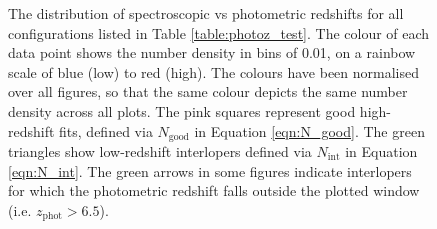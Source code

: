 \begin{figure}
\centering
{}
\caption[\texorpdfstring{$z_{\mathrm{spec}}$}{} vs \texorpdfstring{$z_{\mathrm{phot}}$}{} distributions of the test configurations]{The distribution of spectroscopic vs photometric redshifts for all configurations listed in Table \ref{table:photoz_test}. The colour of each data point shows the number density in bins of 0.01, on a rainbow scale of blue (low) to red (high). The colours have been normalised over all figures, so that the same colour depicts the same number density across all plots. The pink squares represent good high-redshift fits, defined via $N_{\mathrm{good}}$ in Equation \ref{eqn:N_good}. The green triangles show low-redshift interlopers defined via $N_{\mathrm{int}}$ in Equation \ref{eqn:N_int}. The green arrows in some figures indicate interlopers for which the photometric redshift falls outside the plotted window (i.e. $z_{\mathrm{phot}}>6.5$).}\label{fig:photoz_distribution}
\end{figure}

